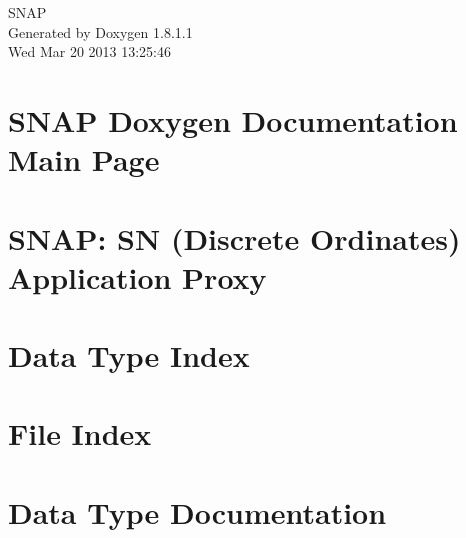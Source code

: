\documentclass{book}
\begin{document}
\hypersetup{pageanchor=false,citecolor=blue}
\begin{titlepage}
\vspace*{7cm}
\begin{center}
{\Large S\-N\-A\-P }\\
\vspace*{1cm}
{\large Generated by Doxygen 1.8.1.1}\\
\vspace*{0.5cm}
{\small Wed Mar 20 2013 13:25:46}\\
\end{center}
\end{titlepage}
\clearemptydoublepage
{}
\tableofcontents
\clearemptydoublepage
{}
\hypersetup{pageanchor=true,citecolor=blue}
\chapter{S\-N\-A\-P Doxygen Documentation Main Page}
\label{index}\hypertarget{index}{}
\chapter{S\-N\-A\-P\-: S\-N (Discrete Ordinates) Application Proxy}
\label{md_README}
\hypertarget{md_README}{}

\chapter{Data Type Index}

\chapter{File Index}

\chapter{Data Type Documentation}



























\end{document}

